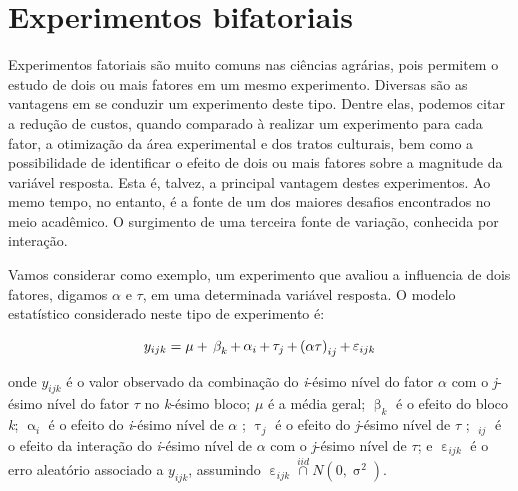 \documentclass[
]{book}
\numberwithin{equation}{section}
\newcommand{\indt}[1]{\index{#1|ST}}
\begin{document}
\hypertarget{efat}{%
\section{Experimentos bifatoriais}\label{efat}}

Experimentos fatoriais são muito comuns nas ciências agrárias, pois permitem o estudo de dois ou mais fatores em um mesmo experimento. Diversas são as vantagens em se conduzir um experimento deste tipo. Dentre elas, podemos citar a redução de custos, quando comparado à realizar um experimento para cada fator, a otimização da área experimental e dos tratos culturais, bem como a possibilidade de identificar o efeito de dois ou mais fatores sobre a magnitude da variável resposta. Esta é, talvez, a principal vantagem destes experimentos. Ao memo tempo, no entanto, é a fonte de um dos maiores desafios encontrados no meio acadêmico. O surgimento de uma terceira fonte de variação, conhecida por interação. \indt{interação}

Vamos considerar como exemplo, um experimento que avaliou a influencia de dois fatores, digamos \(\alpha\) e \(\tau\), em uma determinada variável resposta. O modelo estatístico considerado neste tipo de experimento é:

\[
{y_{ijk}} = {\rm{ }}\mu {\rm{ }} + {\rm{ }}\mathop \beta \nolimits_{k}  + \mathop \alpha \nolimits_i  + \mathop \tau \nolimits_j  + \mathop {(\alpha \tau )}\nolimits_{ij}  + {\rm{ }}\mathop \varepsilon \nolimits_{ijk}
\]

onde \({y_{ijk}}\) é o valor observado da combinação do \emph{i}-ésimo nível do fator \(\alpha\) com o \emph{j}-ésimo nível do fator \(\tau\) no \emph{k}-ésimo bloco; \(\mu\) é a média geral; \(\mathop \beta \nolimits_{k}\) é o efeito do bloco \emph{k}; \(\mathop \alpha \nolimits_i\) é o efeito do \emph{i}-ésimo nível de \(\alpha\) ; \(\mathop \tau \nolimits_j\) é o efeito do \emph{j}-ésimo nível de \(\tau\) ; \(\mathop {(\alpha \tau )}\nolimits_{ij}\) é o efeito da interação do \emph{i}-ésimo nível de \(\alpha\) com o \emph{j}-ésimo nível de \(\tau\); e \(\mathop \varepsilon \nolimits_{ijk}\) é o erro aleatório associado a \({y_{ijk}}\), assumindo \(\mathop \varepsilon \nolimits_{ijk} \mathop \cap \limits^{iid} N(0,\mathop \sigma \nolimits^2 )\).
\end{document}
